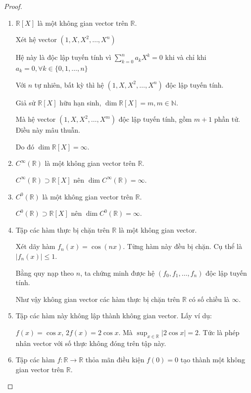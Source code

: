 \begin{proof}
    \begin{enumerate}[label*= (\alph*),itemsep=0pt]
        \item $\mathbb{R}[X]$ là một không gian vector trên $\mathbb{R}$.
              
              Xét hệ vector $(1, X, X^{2}, \ldots , X^{n})$
              
              Hệ này là độc lập tuyến tính vì $\displaystyle\sum^{n}_{k=0}a_{k}X^{k} = 0$ khi và chỉ khi $a_{k} = 0, \forall k\in\{0, 1, \ldots, n\}$
              
              Với $n$ tự nhiên, bất kỳ thì hệ $(1, X, X^{2}, \ldots, X^{n})$ độc lập tuyến tính.
              
              Giả sử $\mathbb{R}[X]$ hữu hạn sinh, $\dim\mathbb{R}[X] = m, m\in\mathbb{N}$.
              
              Mà hệ vector $(1, X, X^{2}, \ldots, X^{m})$ độc lập tuyến tính, gồm $m + 1$ phần tử. Điều này mâu thuẫn.
              
              Do đó $\dim\mathbb{R}[X] = \infty$.
        \item $C^{\infty}(\mathbb{R})$ là một không gian vector trên $\mathbb{R}$.
              
              $C^{\infty}(\mathbb{R})\supset\mathbb{R}[X]$ nên $\dim C^{\infty}(\mathbb{R}) = \infty$.
        \item $C^{0}(\mathbb{R})$ là một không gian vector trên $\mathbb{R}$.
              
              $C^{0}(\mathbb{R})\supset\mathbb{R}[X]$ nên $\dim C^{0}(\mathbb{R}) = \infty$.
        \item Tập các hàm thực bị chặn trên $\mathbb{R}$ là một không gian vector.
              
              Xét dãy hàm $f_{n}(x) = \cos (nx)$. Từng hàm này đều bị chặn. Cụ thể là $\left\vert f_{n}(x)\right\vert \le 1$.
              
              Bằng quy nạp theo $n$, ta chứng minh được hệ $(f_{0}, f_{1}, \ldots, f_{n})$ độc lập tuyến tính.
              
              Như vậy không gian vector các hàm thực bị chặn trên $\mathbb{R}$ có số chiều là $\infty$.
        \item Tập các hàm này không lập thành không gian vector. Lấy ví dụ:
              
              $f(x) = \cos x$, $2f(x) = 2\cos x$. Mà $\sup_{x\in\mathbb{R}}\left\vert 2\cos x\right\vert = 2$. Tức là phép nhân vector với số thực không đóng trên tập này.
        \item Tập các hàm $f: \mathbb{R}\rightarrow\mathbb{R}$ thỏa mãn điều kiện $f(0) = 0$ tạo thành một không gian vector trên $\mathbb{R}$.
              

\end{enumerate}
\end{proof}
